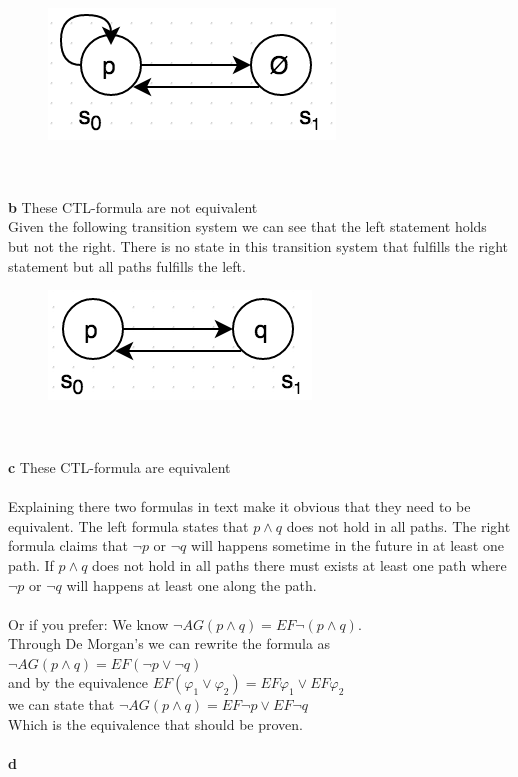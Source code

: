 \documentclass[12pt,oneside,reqno]{amsart}
\begin{document}
	\begin{figure}[h]
      	\includegraphics[scale=0.7]{prob3a}
	\end{figure}\\\\
\textbf{b} These CTL-formula are not equivalent\\
Given the following transition system we can see that the left statement holds but not the right. There is no state in this transition system that fulfills the right statement but all paths fulfills the left.
	\begin{figure}[h]
      	\includegraphics[scale=0.7]{prob3b}
	\end{figure}\\\\
\textbf{c} These CTL-formula are equivalent\\\\
Explaining there two formulas in text make it obvious that they need to be equivalent. The left formula states that $p \land q$ does not hold in all paths. The right formula claims that $\neg p$ or $\neg q$ will happens sometime in the future in at least one path. If $p \land q$ does not hold in all paths there must exists at least one path where $\neg p$ or $\neg q$ will happens at least one along the path.\\\\
Or if you prefer:
We know $\neg AG(p \land q) = EF\neg(p \land q)$.\\
Through De Morgan's we can rewrite the formula as $\neg AG(p\land q) = EF(\neg p \lor \neg q)$\\
and by the equivalence $EF(\varphi_1 \lor \varphi_2)=EF\varphi_1 \lor EF\varphi_2$\\ we can state that $\neg AG(p\land q) = EF\neg p\lor EF\neg q$\\
Which is the equivalence that should be proven.\\\\

\textbf{d}\\
\end{document}
